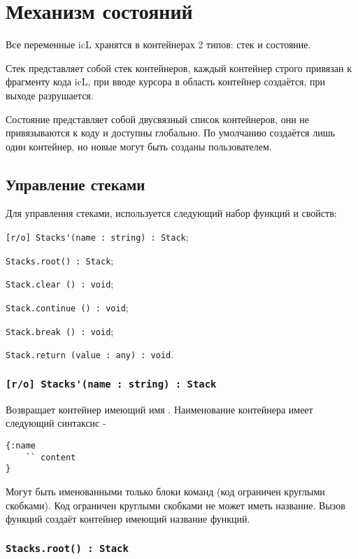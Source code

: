 \section{Механизм состояний}

Все переменные icL хранятся в контейнерах 2 типов: стек и состояние.

Стек представляет собой стек контейнеров, каждый контейнер строго привязан к фрагменту кода icL, при вводе курсора в область контейнер создаётся, при выходе разрушается.

Состояние представляет собой двусвязный список контейнеров, они не привязываются к коду и доступны глобально. По умолчанию создаётся лишь один контейнер, но новые могут быть созданы пользователем.

\subsection{Управление стеками}

Для управления стеками, используется следующий набор функций и свойств:
\begin{icItems}
	\item \lstinline|[r/o] Stacks'(name : string) : Stack|;
	\item \lstinline|Stacks.root() : Stack|;
	\item \lstinline|Stack.clear () : void|;
	\item \lstinline|Stack.continue () : void|;
	\item \lstinline|Stack.break () : void|;
	\item \lstinline|Stack.return (value : any) : void|.
\end{icItems}

\subsubsection{\lstinline|[r/o] Stacks'(name : string) : Stack|}

Возвращает контейнер имеющий имя . Наименование контейнера имеет следующий синтаксис -
\begin{lstlisting}[numbers=none]
{:name
	`` content
}
\end{lstlisting}
Могут быть именованными только блоки команд (код ограничен круглыми скобками). Код ограничен круглыми скобками не может иметь название. Вызов функций создаёт контейнер имеющий название функций.

\subsubsection{\lstinline|Stacks.root() : Stack|}

